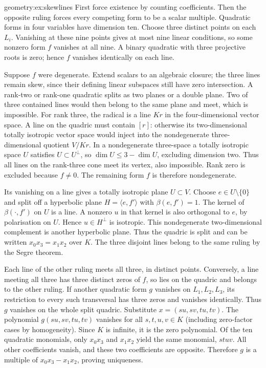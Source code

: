 \begin{solution}{geometry:ex:skewlines}
\idea First force existence by counting coefficients. Then the opposite
ruling forces every competing form to be a scalar multiple.
\writeup Quadratic forms in four variables have dimension ten.
Choose three distinct points on each $L_i$. Vanishing at these nine
points gives at most nine linear conditions, so some nonzero form $f$
vanishes at all nine. A binary quadratic with three projective roots
is zero; hence $f$ vanishes identically on each line.

Suppose $f$ were degenerate. Extend scalars to an algebraic closure;
the three lines remain skew, since their defining linear subspaces
still have zero intersection. A rank-two or rank-one quadratic splits
as two planes or a double plane. Two of three contained lines would
then belong to the same plane and meet, which is impossible.
For rank three, the radical is a line $Kr$ in the four-dimensional
vector space. A line on the quadric must contain $[r]$: otherwise its
two-dimensional totally isotropic vector space would inject into the
nondegenerate three-dimensional quotient $V/Kr$. In a nondegenerate
three-space a totally isotropic space $U$ satisfies $U\subset U^\perp$,
so $\dim U\le3-\dim U$, excluding dimension two.
Thus all lines on the rank-three cone meet its vertex, also impossible.
Rank zero is excluded because $f\ne0$. The remaining form $f$ is therefore nondegenerate.

Its vanishing on a line gives a totally isotropic plane $U\subset V$.
Choose $e\in U\setminus\{0\}$ and split off a hyperbolic plane
$H=\langle e,f'\rangle$ with $\beta(e,f')=1$.
The kernel of $\beta(\cdot,f')$ on $U$ is a line. A nonzero $u$ in
that kernel is also orthogonal to $e$, by polarisation on $U$.
Hence $u\in H^\perp$ is isotropic. This nondegenerate two-dimensional
complement is another hyperbolic plane. Thus the quadric is split and
can be written $x_0x_3=x_1x_2$ over $K$.
The three disjoint lines belong to the same ruling by the Segre theorem.

Each line of the other ruling meets all three, in distinct points.
Conversely, a line meeting all three has three distinct zeros of $f$,
so lies on the quadric and belongs to the other ruling.
If another quadratic form $g$ vanishes on $L_1,L_2,L_3$, its restriction
to every such transversal has three zeros and vanishes identically.
Thus $g$ vanishes on the whole split quadric.
Substitute $x=(su,sv,tu,tv)$. The polynomial $g(su,sv,tu,tv)$ vanishes
for all $s,t,u,v\in K$ (including zero-factor cases by homogeneity).
Since $K$ is infinite, it is the zero polynomial.
Of the ten quadratic monomials, only $x_0x_3$ and $x_1x_2$ yield the
same monomial, $stuv$. All other coefficients vanish, and these two
coefficients are opposite. Therefore $g$ is a multiple of
$x_0x_3-x_1x_2$, proving uniqueness.
\end{solution}

